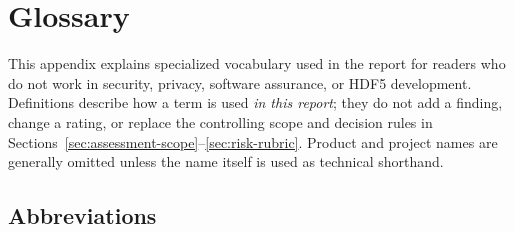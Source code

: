 \documentclass[../main.tex]{subfiles}
\begin{document}
\section{Glossary}
\label{app:glossary}

This appendix explains specialized vocabulary used in the report for readers
who do not work in security, privacy, software assurance, or HDF5 development.
Definitions describe how a term is used \emph{in this report}; they do not add
a finding, change a rating, or replace the controlling scope and decision rules
in Sections~\ref{sec:assessment-scope}--\ref{sec:risk-rubric}. Product and
project names are generally omitted unless the name itself is used as
technical shorthand.

\subsection{Abbreviations}
\end{document}
